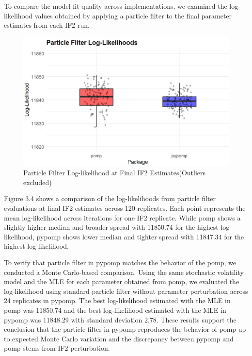 \documentclass[11pt]{report}
\begin{document}
To compare the model fit quality across implementations, we examined the log-likelihood values obtained by applying a particle filter to the final parameter estimates from each IF2 run. 
\begin{figure}[ht] 
\begin{center}
\includegraphics[width=\textwidth]{boxplot_zoomed.jpg}
\end{center}
\caption{Particle Filter Log-likelihood at Final IF2 Estimates(Outliers excluded)}
\label{fig:pfilterplot}
\end{figure}

Figure 3.4 shows a comparison of the log-likelihoods from particle filter evaluations at final IF2 estimates across 120 replicates. Each point represents the mean log-likelihood across iterations for one IF2 replicate. While pomp shows a slightly higher median and broader spread with 11850.74 for the highest log-likelihood, pypomp shows lower median and tighter spread with 11847.34 for the highest log-likelihood.

To verify that particle filter in pypomp matches the behavior of the pomp, we conducted a Monte Carlo-based comparison. Using the same stochastic volatility model and the MLE for each parameter obtained from pomp, we evaluated the log-likelihood using standard particle filter without parameter perturbation across 24 replicates in pypomp. The best log-likelihood estimated with the MLE in pomp was 11850.74 and the best log-likelihood estimated with the MLE in pypomp was 11848.29 with standard deviation 2.78. These results support the conclusion that the particle filter in pypomp reproduces the behavior of pomp up to expected Monte Carlo variation and the discrepancy between pypomp and pomp stems from IF2 perturbation. 
\end{document}
